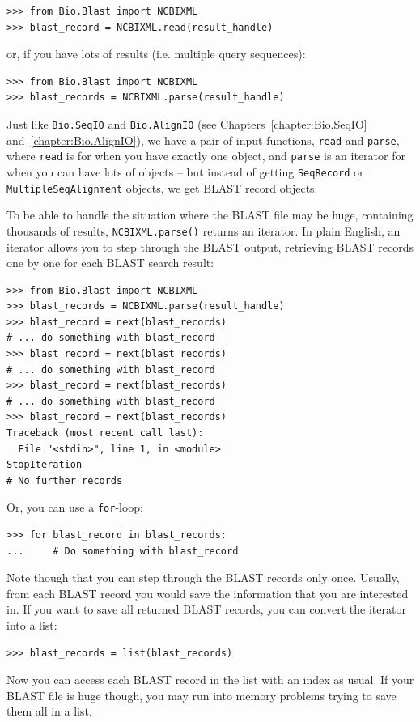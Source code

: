 \documentclass{report}
\begin{document}
\begin{verbatim}
>>> from Bio.Blast import NCBIXML
>>> blast_record = NCBIXML.read(result_handle)
\end{verbatim}

\noindent or, if you have lots of results (i.e. multiple query sequences):

\begin{verbatim}
>>> from Bio.Blast import NCBIXML
>>> blast_records = NCBIXML.parse(result_handle)
\end{verbatim}

Just like \verb|Bio.SeqIO| and \verb|Bio.AlignIO|
(see Chapters~\ref{chapter:Bio.SeqIO} and~\ref{chapter:Bio.AlignIO}),
we have a pair of input functions, \verb|read| and \verb|parse|, where
\verb|read| is for when you have exactly one object, and \verb|parse|
is an iterator for when you can have lots of objects -- but instead of
getting \verb|SeqRecord| or \verb|MultipleSeqAlignment| objects, we
get BLAST record objects.

To be able to handle the situation where the BLAST file may be huge,
containing thousands of results, \verb|NCBIXML.parse()| returns an
iterator. In plain English, an iterator allows you to step through
the BLAST output, retrieving BLAST records one by one for each BLAST
search result:

\begin{verbatim}
>>> from Bio.Blast import NCBIXML
>>> blast_records = NCBIXML.parse(result_handle)
>>> blast_record = next(blast_records)
# ... do something with blast_record
>>> blast_record = next(blast_records)
# ... do something with blast_record
>>> blast_record = next(blast_records)
# ... do something with blast_record
>>> blast_record = next(blast_records)
Traceback (most recent call last):
  File "<stdin>", line 1, in <module>
StopIteration
# No further records
\end{verbatim}

Or, you can use a \verb|for|-loop:
\begin{verbatim}
>>> for blast_record in blast_records:
...     # Do something with blast_record
\end{verbatim}

Note though that you can step through the BLAST records only once.
Usually, from each BLAST record you would save the information that
you are interested in. If you want to save all returned BLAST records,
you can convert the iterator into a list:
\begin{verbatim}
>>> blast_records = list(blast_records)
\end{verbatim}
Now you can access each BLAST record in the list with an index as usual.
If your BLAST file is huge though, you may run into memory problems trying to
save them all in a list.
\end{document}
